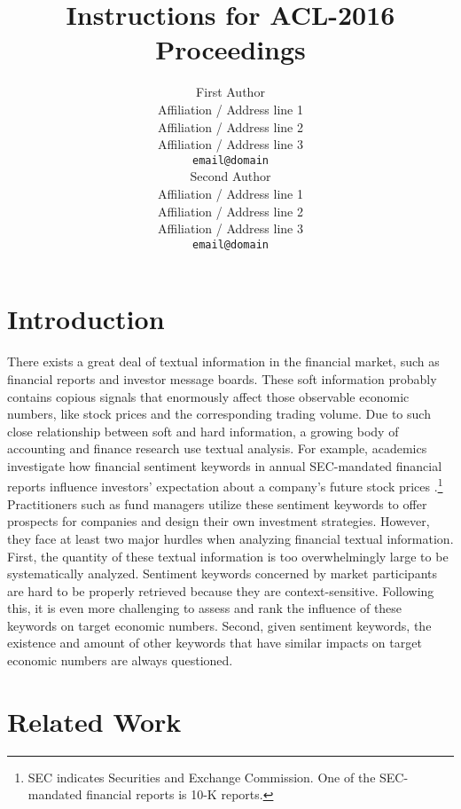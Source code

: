 \documentclass[11pt]{article}
\title{Instructions for ACL-2016 Proceedings}
\author{First Author \\
  Affiliation / Address line 1 \\
  Affiliation / Address line 2 \\
  Affiliation / Address line 3 \\
  {\tt email@domain} \\\And
  Second Author \\
  Affiliation / Address line 1 \\
  Affiliation / Address line 2 \\
  Affiliation / Address line 3 \\
  {\tt email@domain} \\}
\date{}
\begin{document}
\maketitle
\begin{abstract}
\end{abstract}


\section{Introduction}
There exists a great deal of textual information in the financial market, such as financial reports and investor message boards.
These soft information probably contains copious signals that enormously affect those observable economic numbers,
like stock prices and the corresponding trading volume.
Due to such close relationship between soft and hard information,
a growing body of accounting and finance research use textual analysis.
For example, academics investigate how financial sentiment keywords in annual SEC-mandated financial reports
influence investors' expectation about a company's future stock prices \cite{loughran2011liability}.\footnote{SEC indicates Securities and Exchange Commission.
One of the SEC-mandated financial reports is 10-K reports.}
Practitioners such as fund managers utilize these sentiment keywords to offer prospects for companies and design their own investment strategies.
However, they face at least two major hurdles when analyzing financial textual information.
First,
the quantity of these textual information is too overwhelmingly large to be systematically analyzed.
Sentiment keywords concerned by market participants are hard to be properly retrieved because they are context-sensitive.
Following this, it is even more challenging to assess and rank the influence of these keywords on target economic numbers.
Second,
given sentiment keywords, the existence and amount of other keywords that have similar impacts on target economic numbers are always questioned.




\section{Related Work}
\end{document}
